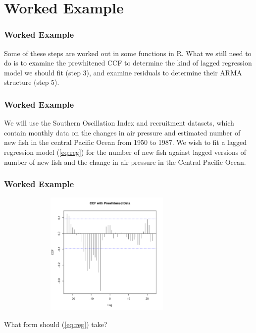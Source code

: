\documentclass[%
xcolor=pdftex]{beamer}
\begin{document}



\section{Worked Example}
\frame{\tableofcontents[currentsection]}

\begin{frame}
\frametitle{Worked Example}

Some of these steps are worked out in some functions in R. What we still need to do is to examine the prewhitened CCF to determine the kind of lagged regression model we should fit (step 3), and examine residuals to determine their ARMA structure (step 5).


\end{frame}

\begin{frame}
\frametitle{Worked Example}

We will use the Southern Oscillation Index and recruitment datasets, which contain monthly data on the changes in air pressure and estimated number of new fish in the central Pacific Ocean from 1950 to 1987. We wish to fit a lagged regression model (\ref{eq:reg}) for the number of new fish against lagged versions of number of new fish and the change in air pressure in the Central Pacific Ocean. 

\end{frame}

\begin{frame}
\frametitle{Worked Example}

\includegraphics[width=110mm, height=60mm]{ccf_soi.pdf}

What form should (\ref{eq:reg}) take?

\end{frame}
\end{document}
